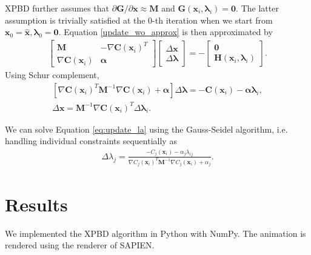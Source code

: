 \documentclass[conference]{IEEEtran}
\begin{document}
XPBD \cite{macklin_xpbd_2016} further assumes that $\partial \mathbf G / \partial \mathbf x \approx \mathbf M$ and $\mathbf G(\mathbf x_i, \boldsymbol{\lambda}_i) = \mathbf 0$. The latter assumption is trivially satisfied at the $0$-th iteration when we start from $\mathbf x_0 = \mathbf {\hat x}, \boldsymbol{\lambda}_0 = \mathbf 0$. Equation \ref{update_wo_approx} is then approximated by
\begin{align}
    \begin{bmatrix}
        \mathbf M & -\nabla \mathbf C (\mathbf x_i) ^T \\
        \nabla \mathbf C (\mathbf x_i) & \boldsymbol{\alpha}
    \end{bmatrix} 
    \begin{bmatrix}
        \Delta \mathbf x \\
        \Delta \boldsymbol{\lambda}
    \end{bmatrix} = 
    -\begin{bmatrix}
        \mathbf 0 \\
        \mathbf H(\mathbf x_i, \boldsymbol{\lambda}_i)
    \end{bmatrix}. \label{update_wo_approx}
\end{align}
Using Schur complement,
\begin{align}
    \left[ \nabla \mathbf C (\mathbf x_i) ^T \mathbf M^{-1} \nabla \mathbf C (\mathbf x_i) + \boldsymbol{\alpha} \right]\Delta \boldsymbol{\lambda} = -\mathbf C(\mathbf x_i) - \boldsymbol{\alpha} \boldsymbol \lambda_i, \label{eq:update_la}\\
    \Delta \mathbf x = \mathbf M^{-1} \nabla \mathbf C(\mathbf x_i) ^T \Delta \boldsymbol{\lambda}_i. 
\end{align}

We can solve Equation \ref{eq:update_la} using the Gauss-Seidel algorithm, i.e. handling individual constraints sequentially as
\begin{align}
    \Delta\lambda_j = \frac{-C_j(\mathbf x_i) - \alpha_j \lambda_{ij}}{\nabla C_j (\mathbf x_i) ^T \mathbf M^{-1} \nabla C_j (\mathbf x_i) + \alpha_j}.
\end{align}

\section{Results}

We implemented the XPBD algorithm in Python with NumPy. The animation is rendered using the renderer of SAPIEN\cite{Xiang_2020_SAPIEN}. 
\end{document}
